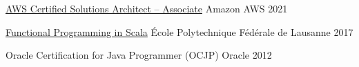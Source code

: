 





\begin{cventries}

    \cventry
    {\href{https://www.credly.com/badges/e5761b98-edf5-44ec-bb32-24f18672e7de/public_url}{AWS Certified Solutions Architect – Associate}}
    {\hspace{0.5em}Amazon AWS} %
    {}
    {2021}
    {}
    {}
    {}

    \cventry
    {\href{https://www.coursera.org/account/accomplishments/specialization/9NNUCHVNV36F}{Functional Programming in Scala}}
    {\hspace{0.5em}École Polytechnique Fédérale de Lausanne} %
    {}
    {2017}
    {}
    {}
    {}

    \cventry
    {Oracle Certification for Java Programmer (OCJP)} %
    {\hspace{0.5em}Oracle} %
    {}
    {2012} %
    {}
    {}
    {}


\end{cventries}
